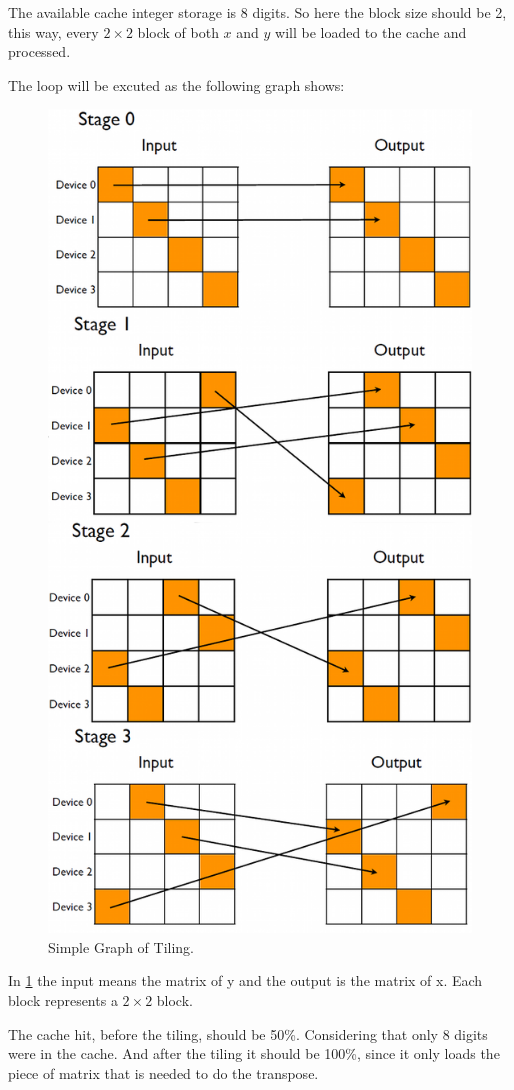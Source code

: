 \documentclass[12pt]{article}
\begin{document}
The available cache integer storage is 8 digits. So here the block
size should be 2, this way, every $2\times 2$ block of both $x$ and
$y$ will be loaded to the cache and processed.

The loop will be excuted as the following graph shows:

\begin{figure}[!ht]
  \centering
  \includegraphics[scale=0.2]{img/tilling.png}
  \caption{Simple Graph of Tiling.}
  \label{fig:n}
\end{figure}

In \ref{fig:n} the input means the matrix of y and the output is the
matrix  of x. Each block represents a $2\times 2$ block.

The cache hit, before the tiling, should be 50\%. Considering that
only 8 digits were in the cache. And after the tiling it should be
100\%, since it only loads the piece of matrix that is needed to do
the transpose.
\end{document}
